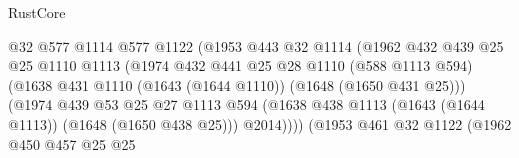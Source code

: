\begin{lexlean}{RustCore}
\begin{coremodule}
                                        @32
                                        @577
                                        @1114
                                        @577
                                        @1122
                                        (@1953
                                          @443
                                          @32
                                          @1114
                                          (@1962
                                            @432
                                            @439
                                            @25
                                            @25
                                            @1110
                                            @1113
                                            (@1974
                                              @432
                                              @441
                                              @25
                                              @28
                                              @1110
                                              (@588 @1113 @594)
                                              (@1638
                                                @431
                                                @1110
                                                (@1643 (@1644 @1110))
                                                (@1648 (@1650 @431 @25)))
                                              (@1974
                                                @439
                                                @53
                                                @25
                                                @27
                                                @1113
                                                @594
                                                (@1638
                                                  @438
                                                  @1113
                                                  (@1643 (@1644 @1113))
                                                  (@1648 (@1650 @438 @25)))
                                                @2014))))
                                        (@1953
                                          @461
                                          @32
                                          @1122
                                          (@1962
                                            @450
                                            @457
                                            @25
                                            @25

\end{coremodule}
\end{lexlean}
